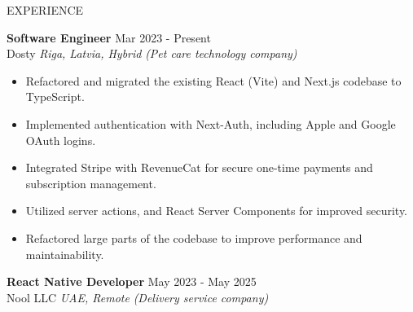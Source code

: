 \documentclass{resume} %
\begin{document}

\begin{rSection}{EXPERIENCE}

\textbf{Software Engineer} \hfill Mar 2023 - Present\\
Dosty \hfill \textit{Riga, Latvia, Hybrid}
\textit{(Pet care technology company)}
 \begin{itemize}
    \itemsep -3pt {} 
        \item Refactored and migrated the existing React (Vite) and Next.js codebase to TypeScript.
        \item Implemented authentication with Next-Auth, including Apple and Google OAuth logins.
        \item Integrated Stripe with RevenueCat for secure one-time payments and subscription management.
        \item Utilized server actions, and React Server Components for improved security.
        \item Refactored large parts of the codebase to improve performance and maintainability.
 \end{itemize}

\textbf{React Native Developer} \hfill May 2023 - May 2025\\
Nool LLC \hfill \textit{UAE, Remote}
\textit{(Delivery service company)}


\end{rSection}
\end{document}
